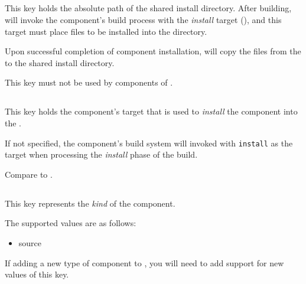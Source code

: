 
\subsection{}\label{variables:install-directory}

This key holds the absolute path of the shared install directory.
After building, \lmsbw will invoke the component's build process with
the \emph{install} target (), and this
target must place files to be installed into the \destdir directory.

Upon successful completion of component installation, \lmsbw will copy
the files from the \destdir to the shared install directory.

This key must not be used by components of \lmsbw.


\subsection{}\label{variables:install-target}

This key holds the component's \makefile target that is used to
\emph{install} the component into the \destdir.

If not specified, the component's build system will invoked with
\texttt{install} as the target when processing the \emph{install}
phase of the build.

Compare to .


\subsection{}\label{variables:kind}

This key represents the \emph{kind} of the component.

The supported values are as follows:

\begin{itemize}
\item source
\end{itemize}

If adding a new type of component to \lmsbw, you will need to add
support for new values of this key.

